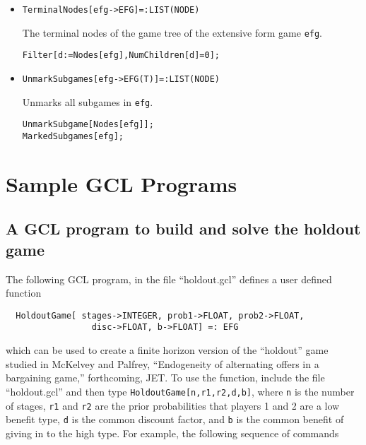 \begin{itemize}
\item{}
\protect \large \begin{verbatim}
TerminalNodes[efg->EFG]=:LIST(NODE)
\end{verbatim}\normalsize

\bd 
The terminal nodes of the game tree of the extensive form game \verb+efg+.
\begin{verbatim}
Filter[d:=Nodes[efg],NumChildren[d]=0];
\end{verbatim} 
\ed

\item{}
\protect \large \begin{verbatim}
UnmarkSubgames[efg->EFG(T)]=:LIST(NODE)
\end{verbatim}\normalsize

\bd 
Unmarks all subgames in \verb+efg+.
\begin{verbatim}
UnmarkSubgame[Nodes[efg]];
MarkedSubgames[efg];
\end{verbatim} 
\ed

\end{itemize}

\appendix
\chapter{Sample GCL Programs}
\pagestyle{headings}

\section{A GCL program to build and solve the holdout game}

The following GCL program, in the file ``holdout.gcl'' defines a user
defined function

\begin{verbatim}
  HoldoutGame[ stages->INTEGER, prob1->FLOAT, prob2->FLOAT, 
                 disc->FLOAT, b->FLOAT] =: EFG
\end{verbatim}

\noindent
which can be used to create a finite horizon version of the
``holdout'' game studied in McKelvey and Palfrey, ``Endogeneity of
alternating offers in a bargaining game,'' forthcoming, JET.  To use
the function, include the file ``holdout.gcl'' and then type
\verb+HoldoutGame[n,r1,r2,d,b]+, where \verb+n+ is the number of
stages, \verb+r1+ and \verb+r2+ are the prior probabilities that
players 1 and 2 are a low benefit type, \verb+d+ is the common
discount factor, and \verb+b+ is the common benefit of giving in to
the high type.  For example, the following sequence of commands

